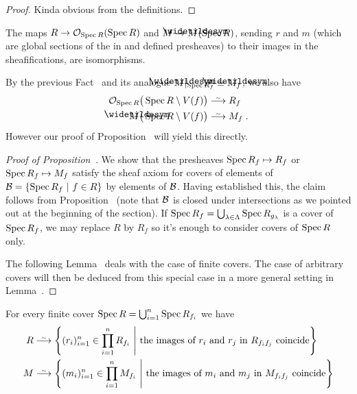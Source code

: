 \documentclass[a4paper,parskip=half,numbers=enddot, DIV=12]{scrreprt}
\begin{document}
\begin{proof}
	Kinda obvious from the definitions.
\end{proof}
\begin{prop}
    The maps $R\morphism \Oo_{\Spec R}(\Spec R)$ and $M\morphism \snake M (\Spec R)$, sending $r$ and $m$ (which are global sections of the in  and  defined presheaves) to their images in the sheafifications, are isomorphisms.
\end{prop}
\begin{rem*}
    By the previous Fact~ and its analogue $\snake M|_{\Spec R_f} \simeq \snake{M}_f$, we also have
    \begin{align*}
        \Oo_{\Spec R}\big(\Spec R\setminus V(f)\big) &\isomorphism R_f\\
        \snake M\big(\Spec R\setminus V(f)\big) &\isomorphism M_f\;.
    \end{align*}
    However our proof of Proposition~ will yield this directly.
\end{rem*}
\begin{proof}[Proof of Proposition~]
    We show that the presheaves $\operatorname{Spec} R_f\mapsto R_f$ or $\operatorname{Spec} R_f\mapsto M_f$ satisfy the sheaf axiom for covers of elements of $\mathcal{B}= \left\{\operatorname{Spec} R_f\ \middle|\  f\in R\right\}$ by elements of $\mathcal{B}$. Having established this, the claim follows from Proposition~ (note that $\mathcal{B}$ is closed under intersections as we pointed out at the beginning of the section).  If $\operatorname{Spec} R_f = \bigcup_{\lambda\in\Lambda} \operatorname{Spec} R_{g_\lambda}$ is a cover of $\operatorname{Spec} R_f$, we may replace $R$ by $R_f$ so it's enough to consider covers of $\operatorname{Spec} R$ only.
    
    The following Lemma~ deals with the case of finite covers. The case of arbitrary covers will then be deduced from this special case in a more general setting in Lemma~.
\end{proof}
\begin{lem}
    For every finite cover $\operatorname{Spec} R = \bigcup_{i=1}^n \operatorname{Spec} R_{f_i}$ we have
    \begin{align*}
        R &\isomorphism\left\{(r_i)_{i=1}^n \in \prod_{i=1}^n R_{f_i}\st \text{the images of } r_i \text{ and } r_j \text{ in } R_{f_if_j} \text{ coincide}\right\}\\
        M &\isomorphism\left\{(m_i)_{i=1}^n \in \prod_{i=1}^n M_{f_i}\st \text{the images of } m_i \text{ and } m_j \text{ in } M_{f_if_j} \text{ coincide}\right\}
    \end{align*}
\end{lem}
\end{document}
